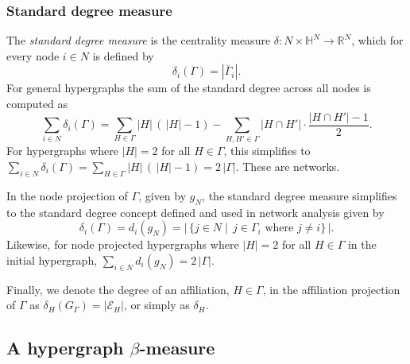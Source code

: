 \subsubsection*{Standard degree measure}

The \emph{standard degree measure} is the centrality measure $\delta \colon N \times \mathbb{H}^N \to \mathbb{R}^N$, which for every node $i \in N$ is defined by
\begin{equation}
\delta_i (\Gamma ) = \left| \overline{\Gamma}_i \right| .
\end{equation}
For general hypergraphs the sum of the standard degree across all nodes is computed as
\begin{equation}
\sum_{i \in N} \delta_i (\Gamma ) = \sum_{H \in \Gamma} | H | \, ( \, | H | - 1) - \sum_{H,H' \in \Gamma} | H \cap H' | \cdot \frac{| H \cap H' | - 1}{2} .
\end{equation}
For hypergraphs where $| H | = 2$ for all $H \in \Gamma$, this simplifies to $\sum_{i \in N} \delta_i (\Gamma ) = \sum_{H \in \Gamma} | H | \, ( \, | H | - 1) = 2 \, | \Gamma |$. These are networks.

In the node projection of $\Gamma$, given by $g_N$, the standard degree measure simplifies to the standard degree concept defined and used in network analysis given by
\begin{equation}
\delta_i (\Gamma ) = d_i (g_N ) = | \, \{ j \in N \mid \, j  \in \Gamma_{i} \mbox{ where } j \neq i \}  \, |.
\end{equation}
Likewise, for node projected hypergraphs where $| H | = 2$ for all $H \in \Gamma$ in the initial hypergraph, $\sum_{i \in N} d_i (g_{N}) = 2 \, | \Gamma |$.

Finally, we denote the degree of an affiliation, $H \in \Gamma$, in the affiliation projection of $\Gamma$ as $\delta_{H}(G_{\Gamma}) = | \mathcal{E}_{H} |$, or simply as $\delta_{H}$.

\subsection{A hypergraph $\beta$-measure}


